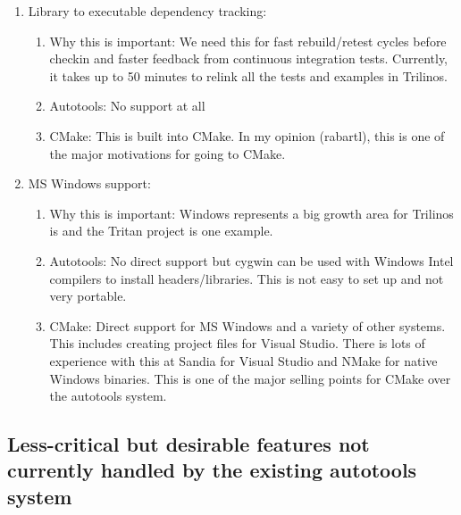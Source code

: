 \documentclass[pdf,ps2pdf,11pt]{SANDreport}
\begin{document}
\begin{enumerate}

{}\item Library to executable dependency tracking:

  \begin{enumerate}

  {}\item Why this is important: We need this for fast
  rebuild/retest cycles before checkin and faster feedback from
  continuous integration tests.  Currently, it takes up to 50
  minutes to relink all the tests and examples in Trilinos.

  {}\item Autotools: No support at all

  {}\item CMake: This is built into CMake.  In my opinion (rabartl),
  this is one of the major motivations for going to CMake.

  \end{enumerate}

{}\item MS Windows support:

  \begin{enumerate}

  {}\item Why this is important: Windows represents a big growth
  area for Trilinos is and the Tritan project is one example.

  {}\item Autotools: No direct support but cygwin can be used with
  Windows Intel compilers to install headers/libraries.  This is not
  easy to set up and not very portable.

  {}\item CMake: Direct support for MS Windows and a variety of
  other systems.  This includes creating project files for Visual
  Studio.  There is lots of experience with this at Sandia for
  Visual Studio and NMake for native Windows binaries.  This is one
  of the major selling points for CMake over the autotools system.

  \end{enumerate}

\end{enumerate}


%
{}\subsection{Less-critical but desirable features not currently
handled by the existing autotools system}
%
\end{document}

